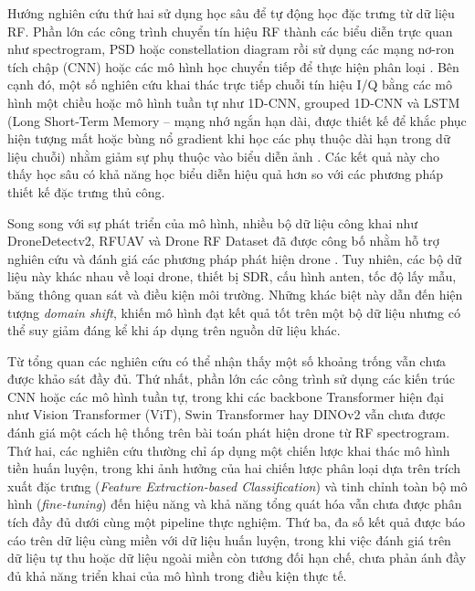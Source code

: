 \documentclass[../DoAn.tex]{subfiles}
\begin{document}
Hướng nghiên cứu thứ hai sử dụng học sâu để tự động học đặc trưng từ dữ liệu RF. Phần lớn các công trình chuyển tín hiệu RF thành các biểu diễn trực quan như spectrogram, PSD hoặc constellation diagram rồi sử dụng các mạng nơ-ron tích chập (CNN) hoặc các mô hình học chuyển tiếp để thực hiện phân loại \cite{swinney2021operating,swinney2021flightmode}. Bên cạnh đó, một số nghiên cứu khai thác trực tiếp chuỗi tín hiệu I/Q bằng các mô hình một chiều hoặc mô hình tuần tự như 1D-CNN, grouped 1D-CNN và LSTM (Long Short-Term Memory – mạng nhớ ngắn hạn dài, được thiết kế để khắc phục hiện tượng mất hoặc bùng nổ gradient khi học các phụ thuộc dài hạn trong dữ liệu chuỗi) nhằm giảm sự phụ thuộc vào biểu diễn ảnh \cite{allahham2020multichannel,huynhthe2022rfuavnet,kunze2024lstm,alam2023rf}. Các kết quả này cho thấy học sâu có khả năng học biểu diễn hiệu quả hơn so với các phương pháp thiết kế đặc trưng thủ công.

Song song với sự phát triển của mô hình, nhiều bộ dữ liệu công khai như DroneDetectv2, RFUAV và Drone RF Dataset đã được công bố nhằm hỗ trợ nghiên cứu và đánh giá các phương pháp phát hiện drone \cite{swinney2021dronedetect,shi2025rfuav,HZRVNZ_2024}. Tuy nhiên, các bộ dữ liệu này khác nhau về loại drone, thiết bị SDR, cấu hình anten, tốc độ lấy mẫu, băng thông quan sát và điều kiện môi trường. Những khác biệt này dẫn đến hiện tượng \textit{domain shift}, khiến mô hình đạt kết quả tốt trên một bộ dữ liệu nhưng có thể suy giảm đáng kể khi áp dụng trên nguồn dữ liệu khác.

Từ tổng quan các nghiên cứu có thể nhận thấy một số khoảng trống vẫn chưa được khảo sát đầy đủ. Thứ nhất, phần lớn các công trình sử dụng các kiến trúc CNN hoặc các mô hình tuần tự, trong khi các backbone Transformer hiện đại như Vision Transformer (ViT), Swin Transformer hay DINOv2 vẫn chưa được đánh giá một cách hệ thống trên bài toán phát hiện drone từ RF spectrogram. Thứ hai, các nghiên cứu thường chỉ áp dụng một chiến lược khai thác mô hình tiền huấn luyện, trong khi ảnh hưởng của hai chiến lược phân loại dựa trên trích xuất đặc trưng (\textit{Feature Extraction-based Classification}) và tinh chỉnh toàn bộ mô hình (\textit{fine-tuning}) đến hiệu năng và khả năng tổng quát hóa vẫn chưa được phân tích đầy đủ dưới cùng một pipeline thực nghiệm. Thứ ba, đa số kết quả được báo cáo trên dữ liệu cùng miền với dữ liệu huấn luyện, trong khi việc đánh giá trên dữ liệu tự thu hoặc dữ liệu ngoài miền còn tương đối hạn chế, chưa phản ánh đầy đủ khả năng triển khai của mô hình trong điều kiện thực tế.
\end{document}
